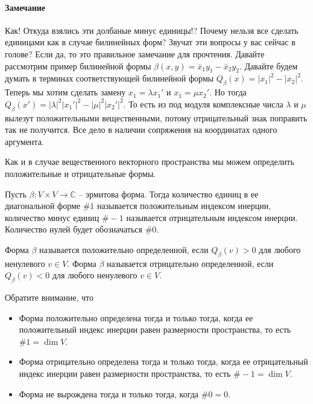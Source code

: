 \paragraph{Замечание}

Как!
Откуда взялись эти долбаные минус единицы!?
Почему нельзя все сделать единицами как в случае билинейных форм?
Звучат эти вопросы у вас сейчас в голове?
Если да, то это правильное замечание для прочтения.
Давайте рассмотрим пример билинейной формы $\beta(x,y) = \bar x_1 y_1 - \bar x_2 y_2$.
Давайте будем думать в терминах соответствующей билинейной формы $Q_\beta(x) = |x_1|^2 - |x_2|^2$.
Теперь мы хотим сделать замену $x_1 = \lambda x_1'$ и $x_1 = \mu x_2'$.
Но тогда $Q_\beta(x') = |\lambda|^2 |x_1'|^2 - |\mu|^2 |x_2'|^2$.
То есть из под модуля комплексные числа $\lambda$ и $\mu$ вылезут положительными вещественными, потому отрицательный знак поправить так не получится.
Все дело в наличии сопряжения на координатах одного аргумента.

Как и в случае вещественного векторного пространства мы можем определить положительные и отрицательные формы.

\begin{definition}
Пусть $\beta\colon V\times V\to \mathbb C$ -- эрмитова форма.
Тогда количество единиц в ее диагональной форме $\#1$ называется положительным индексом инерции, количество минус единиц $\#-1$ называется отрицательным индексом инерции.
Количество нулей будет обозначаться $\# 0$.

Форма $\beta$ называется положительно определенной, если $Q_\beta(v) > 0$ для любого ненулевого $v\in V$.
Форма $\beta$ называется отрицательно определенной, если $Q_\beta(v)<0$ для любого ненулевого $v\in V$.
\end{definition}

Обратите внимание, что 
\begin{itemize}
\item Форма положительно определена тогда и только тогда, когда ее положительный индекс инерции равен размерности пространства, то есть $\# 1 = \dim V$.

\item Форма отрицательно определена тогда и только тогда, когда ее отрицательный индекс инерции равен размерности пространства, то есть $\#-1 = \dim V$.

\item Форма не вырождена тогда и только тогда, когда $\# 0 = 0$.
\end{itemize}


